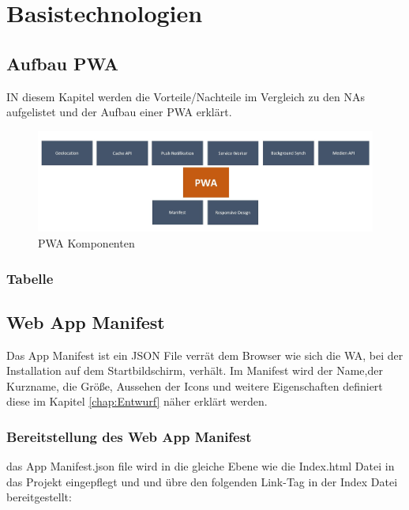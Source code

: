 \chapter{Basistechnologien}
\thispagestyle{standard}
\pagestyle{standard}
\renewcommand{\footrulewidth}{0.4pt}

\section{Aufbau PWA}
IN diesem Kapitel werden die Vorteile/Nachteile im Vergleich zu den \acl{NA}s aufgelistet und der Aufbau einer \acs{PWA} erklärt.  

  \begin{figure}[h]
	\centering
	\includegraphics[width=14cm]{BilderAllgemein/PWA_Features}\medskip
	\caption{PWA Komponenten}
	\label{fig:Komponenten}
\end{figure}

\subsection{Tabelle}







\section{Web App Manifest}
Das App Manifest ist ein JSON File verrät dem Browser wie sich die \acs{WA}, bei der Installation auf dem Startbildschirm, verhält. Im Manifest wird der Name,der Kurzname, die Größe, Aussehen der Icons und weitere Eigenschaften definiert diese im Kapitel \ref{chap:Entwurf} näher erklärt werden.

\subsection{Bereitstellung des Web App Manifest}
das App Manifest.json file wird in die gleiche Ebene wie die Index.html Datei in das Projekt eingepflegt und und übre den folgenden Link-Tag in der Index Datei bereitgestellt:


